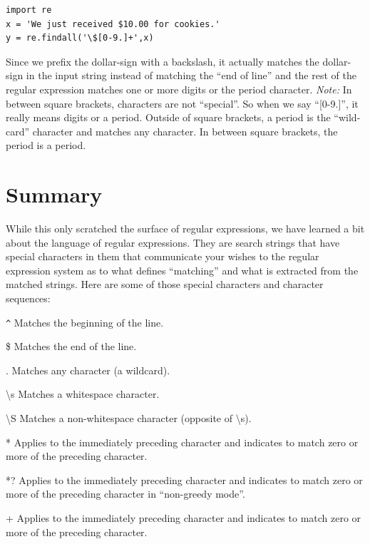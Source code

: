 \documentclass[11pt]{book}
\begin{document}
\beforeverb
\begin{verbatim}
import re
x = 'We just received $10.00 for cookies.'
y = re.findall('\$[0-9.]+',x)
\end{verbatim}
\afterverb
%
Since we prefix the dollar-sign with a backslash, it actually matches the dollar-sign
in the input string instead of matching the ``end of line'' and the rest of the regular
expression matches one or more digits or the period character.  {\em Note:} In between 
square brackets, characters are not ``special''.   So when we say ``[0-9.]'', it really 
means digits or a period.    Outside of square brackets, a period is the ``wild-card'' 
character and matches any character.  In between square brackets, the period is a period.

\section{Summary}

While this only scratched the surface of regular expressions, we have learned a bit about the language of regular expressions.  They are search strings that have special characters in them that communicate your wishes to the regular expression system as to what defines ``matching'' and what is extracted from the matched strings.  Here are some of those special characters and character sequences:

\verb"^" \newline
Matches the beginning of the line.

\$ \newline
Matches the end of the line.

. \newline
Matches any character (a wildcard).

{\textbackslash}s \newline
Matches a whitespace character.

{\textbackslash}S \newline
Matches a non-whitespace character (opposite of {\textbackslash}s).

* \newline
Applies to the immediately preceding character and indicates to match zero or more of the preceding character.

*? \newline
Applies to the immediately preceding character and indicates to match zero or more of the preceding character in ``non-greedy mode''.

+ \newline
Applies to the immediately preceding character and indicates to match zero or more of the preceding character.
\end{document}
